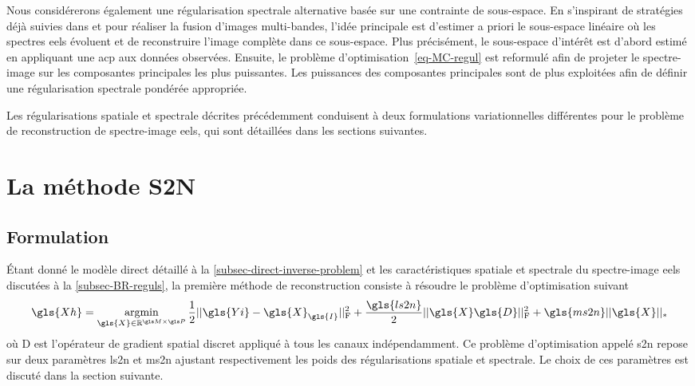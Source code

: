 Nous considérerons également une régularisation spectrale alternative basée sur une contrainte de sous-espace. En s'inspirant de stratégies déjà suivies dans \cite{wei2015bayesian} et \cite{wei2015fast} pour réaliser la fusion d'images multi-bandes, l'idée principale est d'estimer a priori le sous-espace linéaire où les spectres \gls{eels} évoluent et de reconstruire l'image complète dans ce sous-espace. Plus précisément, le sous-espace d'intérêt est d'abord estimé en appliquant une \gls{acp} aux données observées. Ensuite, le problème d'optimisation~\eqref{eq-MC-regul} est reformulé afin de projeter le spectre-image sur les composantes principales les plus puissantes. Les puissances des composantes principales sont de plus exploitées afin de définir une régularisation spectrale pondérée appropriée.

Les régularisations spatiale et spectrale décrites précédemment conduisent à deux formulations variationnelles différentes pour le problème de reconstruction de spectre-image \gls{eels}, qui sont détaillées dans les sections suivantes.

\newpage
%
\section{La méthode S2N}

\subsection{Formulation}\label{s2n-formulation}

\'Etant donné le modèle direct détaillé à la \cref{subsec-direct-inverse-problem} et les caractéristiques spatiale et spectrale du spectre-image \gls{eels} discutées à la \cref{subsec-BR-reguls}, la première méthode de reconstruction consiste à résoudre le problème d'optimisation suivant
\begin{equation}\label{eq-s2n}
    \gls{Xh} = \argmin_{\gls{X}\in\mathbb{R}^{\taille{M}{P}}} %
    \frac{1}{2} \frobnorm{\gls{Yi} - \gls{X}_{\gls{I}}}  +
    \frac{\gls{ls2n}}{2} \frobnorm{\gls{X}\gls{D}} + 
    \gls{ms2n} ||\gls{X}||_*
\end{equation}
où \gls{D} est l'opérateur de gradient spatial discret appliqué à tous les canaux indépendamment. Ce problème d'optimisation appelé \gls{s2n} repose sur deux paramètres \gls{ls2n} et \gls{ms2n} ajustant respectivement les poids des régularisations spatiale et spectrale. Le choix de ces paramètres est discuté dans la section suivante.



